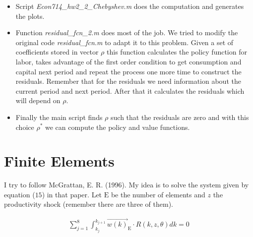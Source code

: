 \documentclass[a4paper,12pt]{article}
\begin{document}
   \begin{itemize}
       \item Script \textit{Econ714\_hw2\_2\_Chebyshev.m} does the computation and generates the plots. 
       
       \item Function \textit{residual\_fcn\_2.m} does most of the job. We tried to modify the original code  \textit{residual\_fcn.m} to adapt it to this problem. Given a set of coefficients stored in vector $\rho$ this function calculates the policy function for labor, takes advantage of the first order condition to get consumption and capital next period and repeat the process one more time to construct the residuals. Remember that for the residuals we need information about the current period and next period. After that it calculates the residuals which will depend on $\rho$. 
       
       \item Finally the main script finds $\rho$ such that the residuals are zero and with this choice $\rho^*$ we can compute the policy and value functions. 
   \end{itemize}
   
   \section{Finite Elements}
   
   I try to follow McGrattan, E. R. (1996). My idea is to solve the system given by equation ($15$) in that paper. Let $\text{E}$ be the number of elements and $z$ the productivity shock (remember there are three of them). 
   
   \begin{align}\label{solve_for_theta}
       \sum_{j=1}^8 \int_{k_j}^{k_{j+1}} \vec{w(k)}_{\text{E}} \cdot R(k, z, \theta) dk = 0   
   \end{align}
   
\end{document}

